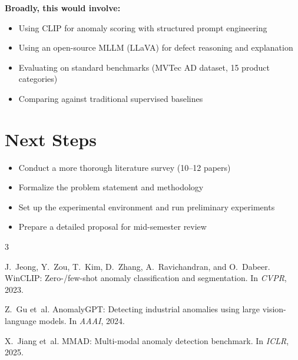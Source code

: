 \documentclass[12pt, a4paper]{article}
\begin{document}
\textbf{Broadly, this would involve:}
\begin{itemize}[leftmargin=*]
    \item Using CLIP for anomaly scoring with structured prompt engineering
    \item Using an open-source MLLM (LLaVA) for defect reasoning and explanation
    \item Evaluating on standard benchmarks (MVTec AD dataset, 15 product categories)
    \item Comparing against traditional supervised baselines
\end{itemize}

\section{Next Steps}

\begin{itemize}[leftmargin=*]
    \item Conduct a more thorough literature survey (10--12 papers)
    \item Formalize the problem statement and methodology
    \item Set up the experimental environment and run preliminary experiments
    \item Prepare a detailed proposal for mid-semester review
\end{itemize}

\begin{thebibliography}{3}

J.~Jeong, Y.~Zou, T.~Kim, D.~Zhang, A.~Ravichandran, and O.~Dabeer.
\newblock WinCLIP: Zero-/few-shot anomaly classification and segmentation.
\newblock In \emph{CVPR}, 2023.

Z.~Gu et~al.
\newblock AnomalyGPT: Detecting industrial anomalies using large vision-language models.
\newblock In \emph{AAAI}, 2024.

X.~Jiang et~al.
\newblock MMAD: Multi-modal anomaly detection benchmark.
\newblock In \emph{ICLR}, 2025.

\end{thebibliography}
\end{document}
